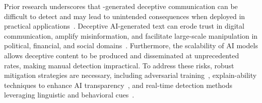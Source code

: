 
Prior research underscores that -generated deceptive
communication can be difficult to detect and may lead to unintended
consequences when deployed in practical applications~\citep{park2024ai,sarkadi2024deceptive}.
%
Deceptive AI-generated text can erode trust in digital communication,
amplify misinformation, and facilitate large-scale manipulation in
political, financial, and social domains~\citep{solaiman2019release,
  weidinger2022taxonomy}.
%
Furthermore, the scalability of AI models allows deceptive content to
be produced and disseminated at unprecedented rates, making manual
detection impractical.
%
To address these risks, robust mitigation strategies are necessary,
including adversarial training~\citep{perez2022red}, explain-ability
techniques to enhance AI transparency~\citep{danilevsky2020explainability}, and real-time detection methods
leveraging linguistic and behavioral cues~\citep{vosoughi2018spread}.



